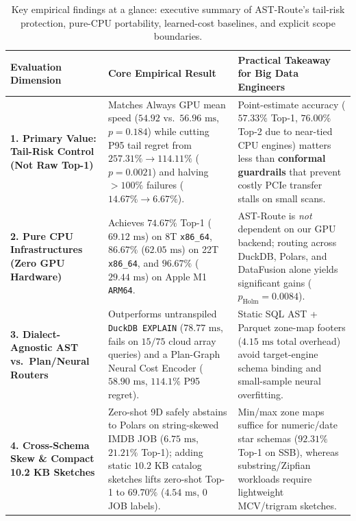 \documentclass[10pt,a4paper]{article}
\newenvironment{fitasttable}{%
  \begin{lrbox}{\asttblbox}%
}{%
  \end{lrbox}%
  \sbox{\asttblboxB}{%
    \ifdim\wd\asttblbox>0.96\textwidth
      \resizebox{0.96\textwidth}{!}{\usebox{\asttblbox}}%
    \else
      \usebox{\asttblbox}%
    \fi
  }%
  \ifdim\ht\asttblboxB>0.72\textheight
    \resizebox{!}{0.72\textheight}{\usebox{\asttblboxB}}%
  \else
    \usebox{\asttblboxB}%
  \fi
}
\begin{document}
\begin{table}[!htbp]
{\centering
\caption{Key empirical findings at a glance: executive summary of AST-Route's tail-risk protection, pure-CPU portability, learned-cost baselines, and explicit scope boundaries.}\label{tab:key_findings_glance}\label{tab:jbd_glance_1a}
\setlength{\tabcolsep}{4.0pt}
\scriptsize
\begin{fitasttable}
\begin{tabular}{@{}p{2.9cm}p{5.3cm}p{6.8cm}@{}}
\toprule
\textbf{Evaluation Dimension} & \textbf{Core Empirical Result} & \textbf{Practical Takeaway for Big Data Engineers} \\
\midrule
\textbf{1. Primary Value: Tail-Risk Control (Not Raw Top-1)} & Matches Always GPU mean speed ($54.92$ vs.\ $56.96\text{ ms}$, $p=0.184$) while cutting P95 tail regret from $\mathbf{257.31\% \rightarrow 114.11\%}$ ($p=0.0021$) and halving $>100\%$ failures ($14.67\%\rightarrow 6.67\%$). & Point-estimate accuracy ($57.33\%$ Top-1, $76.00\%$ Top-2 due to near-tied CPU engines) matters less than \textbf{conformal guardrails} that prevent costly PCIe transfer stalls on small scans. \\
\textbf{2. Pure CPU Infrastructures (Zero GPU Hardware)} & Achieves $74.67\%$ Top-1 ($69.12\text{ ms}$) on 8T \texttt{x86\_64}, $86.67\%$ ($62.05\text{ ms}$) on 22T \texttt{x86\_64}, and $96.67\%$ ($29.44\text{ ms}$) on Apple M1 \texttt{ARM64}. & AST-Route is \emph{not} dependent on our GPU backend; routing across DuckDB, Polars, and DataFusion alone yields significant gains ($p_{\text{Holm}}=0.0084$). \\
\textbf{3. Dialect-Agnostic AST vs.\ Plan/Neural Routers} & Outperforms untranspiled \texttt{DuckDB EXPLAIN} ($78.77\text{ ms}$, fails on $15/75$ cloud array queries) and a Plan-Graph Neural Cost Encoder ($58.90\text{ ms}$, $114.1\%$ P95 regret). & Static SQL AST + Parquet zone-map footers ($4.15\text{ ms}$ total overhead) avoid target-engine schema binding and small-sample neural overfitting. \\
\textbf{4. Cross-Schema Skew \& Compact 10.2 KB Sketches} & Zero-shot 9D safely abstains to Polars on string-skewed IMDB JOB ($6.75\text{ ms}$, $21.21\%$ Top-1); adding static $10.2\text{ KB}$ catalog sketches lifts zero-shot Top-1 to $\mathbf{69.70\%}$ ($4.54\text{ ms}$, $0$ JOB labels). & Min/max zone maps suffice for numeric/date star schemas ($92.31\%$ Top-1 on SSB), whereas substring/Zipfian workloads require lightweight MCV/trigram sketches. \\

\end{tabular}
\end{fitasttable}}
\end{table}
\end{document}
